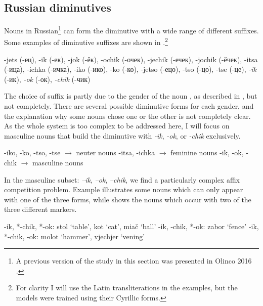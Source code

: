 \subsection{Russian diminutives}

%
Nouns in Russian\footnote{A previous version of the study in this section was presented in Olinco 2016 \autocite{GuzmanNaranjo.2016a}.} can form the diminutive with a wide range of different suffixes. Some examples of diminutive suffixes are shown in .\footnote{For clarity I will use the Latin transliterations in the examples, but the models were trained using their Cyrillic forms.}

\begin{exe}
    \ex \label{dims-russian} -jets (-ец), -ik (-ек),  -jok (-ёк), -ochik (-очек), -jechik (-ечек), -jochik (-ёчек), -itsa (-ица), -ichka (-ичка), -iko (-ико), -ko (-ко), -jetso (-ецо), -tso (-цо), -tse (-це),  \textit{-ik} (-ик),  \textit{-ok} (-ок),  \textit{-chik} (-чик)
\end{exe}

The choice of suffix is partly due to the gender of the noun \autocites{Kempe.2001, Kempe.2003}, as described in , but not completely. There are several possible diminutive forms for each gender, and the explanation why some nouns chose one or the other is not completely clear. As the whole system is too complex to be addressed here, I will focus on masculine nouns that build the diminutive with \textit{-ik}, \textit{-ok}, or \textit{-chik} exclusively.

\begin{exe}
    \ex \label{sys-dim}
    \begin{xlist}
        \ex -iko, -ko, -tso, -tse $\rightarrow$ neuter nouns
        \ex -itsa, -ichka $\rightarrow$ feminine nouns
        \ex -ik, -ok, -chik $\rightarrow$ masculine nouns
    \end{xlist}
\end{exe}

\largerpage
In the masculine subset: \textit{–ik}, \textit{–ok}, \textit{–chik}, we find a particularly complex affix competition problem. Example  illustrates some nouns which can only appear with one of the three forms, while  shows the nouns which occur with two of the three different markers.

\begin{exe}
    \ex \label{ikchikok-single}
    \begin{xlist}
        \ex -ik, *-chik, *-ok: stol `table', kot `cat', miač `ball'
        \ex *-ik, -chik, *-ok: zabor `fence'
        \ex *-ik, *-chik, -ok: molot `hammer', vjechjer `vening'
    \end{xlist}
\end{exe}

